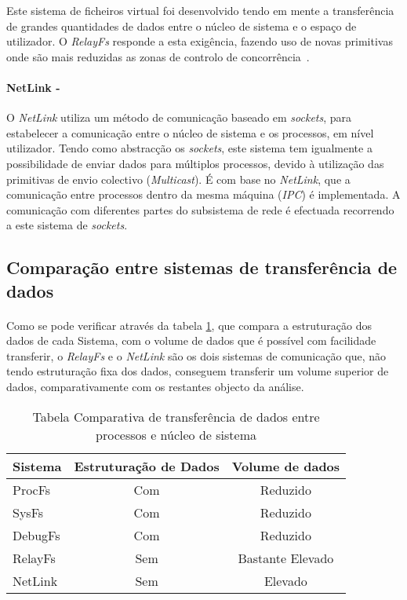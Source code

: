 Este sistema de ficheiros virtual foi desenvolvido tendo em mente a transferência de grandes quantidades de dados entre o núcleo de sistema e o espaço de utilizador.
O \textit{RelayFs} responde a esta exigência, fazendo uso de novas primitivas onde são mais reduzidas as zonas de controlo de concorrência~\cite{Donovan2007,To03relayfs:an}.

\paragraph*{NetLink - }\label{cap:NetLink_overview}
O \textit{NetLink} utiliza um método de comunicação baseado em \textit{sockets}, para estabelecer a comunicação entre o núcleo de sistema e os processos, em nível utilizador. 
 Tendo como abstracção os \textit{sockets}, este sistema tem igualmente a possibilidade de enviar dados para múltiplos processos, devido à utilização das primitivas de envio colectivo (\textit{Multicast}).
É com base no \textit{NetLink}, que a comunicação entre processos dentro da mesma máquina (\textit{IPC}) é implementada.
A comunicação com diferentes partes do subsistema de rede é efectuada recorrendo a este sistema de \textit{sockets}.

\subsection{Comparação entre sistemas de transferência de dados}

\paragraph*{}
Como se pode verificar através da tabela \ref{tab:transf_compare}, que compara a estruturação dos dados de cada Sistema, com o volume de dados que é possível com facilidade transferir, o \textit{RelayFs} e o \textit{NetLink} são os dois sistemas de comunicação que, não tendo estruturação fixa dos dados, conseguem transferir um volume superior de dados, comparativamente com os restantes objecto da análise.

\begin{table}[!htbp]
\begin{center}
\caption{Tabela Comparativa de transferência de dados entre processos e núcleo de sistema}
\begin{tabular}{|l||c|c|}
\hline
Sistema & Estruturação de Dados & Volume de dados \\
\hline
ProcFs & Com & Reduzido \\
\hline
SysFs & Com & Reduzido \\
\hline
DebugFs & Com & Reduzido \\
\hline
RelayFs & Sem & Bastante Elevado \\
\hline
NetLink & Sem & Elevado \\
\hline
\end{tabular}

\label{tab:transf_compare}
\end{center}
\end{table}
 
